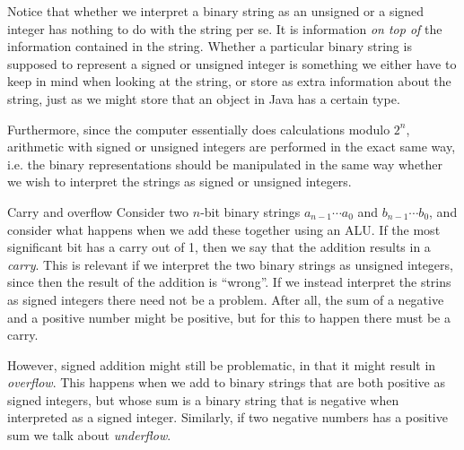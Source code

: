 \documentclass[article, a4paper, 11pt, oneside]{memoir}
\numberwithin{equation}{chapter}
\begin{document}
\begin{notelist}
Notice that whether we interpret a binary string as an unsigned or a signed integer has nothing to do with the string per se. It is information \emph{on top of} the information contained in the string. Whether a particular binary string is supposed to represent a signed or unsigned integer is something we either have to keep in mind when looking at the string, or store as extra information about the string, just as we might store that an object in Java has a certain type.

Furthermore, since the computer essentially does calculations modulo $2^n$, arithmetic with signed or unsigned integers are performed in the exact same way, i.e. the binary representations should be manipulated in the same way whether we wish to interpret the strings as signed or unsigned integers.

\item[Carry and overflow]
Consider two $n$-bit binary strings $a_{n-1} \cdots a_0$ and $b_{n-1} \cdots b_0$, and consider what happens when we add these together using an ALU. If the most significant bit has a carry out of 1, then we say that the addition results in a \emph{carry}. This is relevant if we interpret the two binary strings as unsigned integers, since then the result of the addition is \enquote{wrong}. If we instead interpret the strins as signed integers there need not be a problem. After all, the sum of a negative and a positive number might be positive, but for this to happen there must be a carry.

However, signed addition might still be problematic, in that it might result in \emph{overflow}. This happens when we add to binary strings that are both positive as signed integers, but whose sum is a binary string that is negative when interpreted as a signed integer. Similarly, if two negative numbers has a positive sum we talk about \emph{underflow}.


\end{notelist}
\end{document}

